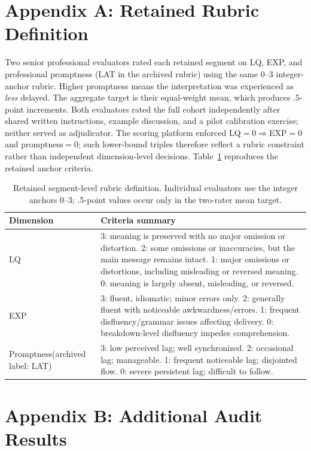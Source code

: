 \section*{Appendix A: Retained Rubric Definition}

Two senior professional evaluators rated each retained segment on LQ, EXP, and
professional promptness (LAT in the archived rubric) using the same 0--3 integer-anchor rubric. Higher
promptness means the interpretation was experienced as \emph{less} delayed. The
aggregate target is their equal-weight mean, which produces .5-point increments.
Both evaluators rated the full cohort independently after shared written instructions,
example discussion, and a pilot calibration exercise; neither served as adjudicator.
The scoring platform enforced LQ$=0\Rightarrow$EXP$=0$ and promptness$=0$; such
lower-bound triples therefore reflect a rubric constraint rather than independent
dimension-level decisions.
Table~\ref{tab:retained-grid} reproduces the retained anchor criteria.

\begin{table}[h]
\centering
\scriptsize
\setlength{\tabcolsep}{2pt}
\caption{Retained segment-level rubric definition. Individual evaluators use the integer anchors 0--3; .5-point values occur only in the two-rater mean target.}
\label{tab:retained-grid}
\begin{tabular}{p{}p{}}
\toprule
Dimension & Criteria summary \\
\midrule
LQ & 3: meaning is preserved with no major omission or distortion. 2: some omissions or inaccuracies, but the main message remains intact. 1: major omissions or distortions, including misleading or reversed meaning. 0: meaning is largely absent, misleading, or reversed. \\
EXP & 3: fluent, idiomatic; minor errors only. 2: generally fluent with noticeable awkwardness/errors. 1: frequent disfluency/grammar issues affecting delivery. 0: breakdown-level disfluency impedes comprehension. \\
Promptness\newline (archived label: LAT) & 3: low perceived lag; well synchronized. 2: occasional lag; manageable. 1: frequent noticeable lag; disjointed flow. 0: severe persistent lag; difficult to follow. \\
\bottomrule
\end{tabular}
\setlength{\tabcolsep}{6pt}
\end{table}

\section*{Appendix B: Additional Audit Results}

